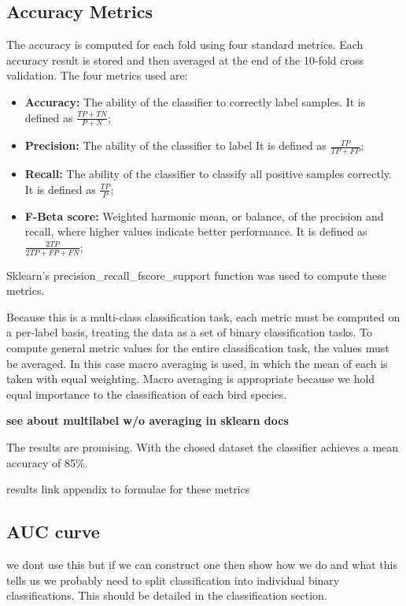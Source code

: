 \subsection{Accuracy Metrics}
The accuracy is computed for each fold using four standard metrics.
Each accuracy result is stored and then averaged at the end of the 10-fold
cross validation.
The four metrics used are:
\begin{itemize}
  \item \textbf{Accuracy:}
    The ability of the classifier to correctly label samples.
    It is defined as $\frac{TP+TN}{P+N}$;

  \item \textbf{Precision:}
    The ability of the classifier to label 
    It is defined as $\frac{TP}{TP+FP}$;

  \item \textbf{Recall:}
    The ability of the classifier to classify all positive samples correctly.
    It is defined as $\frac{TP}{P}$;

  \item \textbf{F-Beta score:}
    Weighted harmonic mean, or balance, of the precision and recall, where
    higher values indicate better performance.
    It is defined as $\frac{2TP}{2TP+FP+FN}$;
\end{itemize}

Sklearn's precision\_recall\_fscore\_support function was used to compute these
metrics.

Because this is a multi-class classification task, each metric must be computed
on a per-label basis, treating the data as a set of binary classification tasks.
To compute general metric values for the entire classification task, the values
must be averaged.
In this case macro averaging is used, in which the mean of each is taken with
equal weighting.
Macro averaging is appropriate because we hold equal importance to the
classification of each bird species.

\textbf{see about multilabel w/o averaging in sklearn docs}

The results are promising.
With the chosed dataset the classifier achieves a mean accuracy of 85\%.


results
link appendix to formulae for these metrics

\subsection{AUC curve}
we dont use this but if we can construct one then show how we do and what
this tells us
we probably need to split classification into individual binary classifications.
This should be detailed in the classification section.

